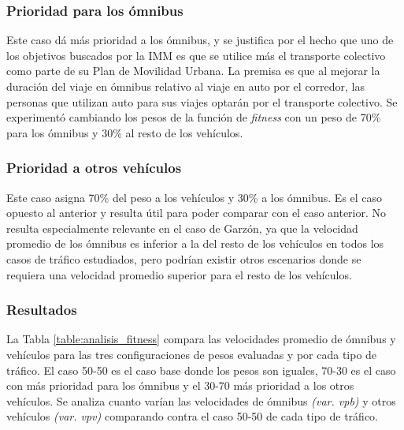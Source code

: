 \subsubsection{Prioridad para los ómnibus}
Este caso dá más prioridad a los ómnibus, y se justifica por el hecho que uno de los objetivos buscados por la IMM es que se utilice más el transporte colectivo como parte de su Plan de Movilidad Urbana. La premisa es que al mejorar la duración del viaje en ómnibus relativo al viaje en auto por el corredor, las personas que utilizan auto para sus viajes optarán por el transporte colectivo. Se experimentó cambiando los pesos de la función de \emph{fitness} con un peso de 70\% para los ómnibus y 30\% al resto de los vehículos.


\subsubsection{Prioridad a otros vehículos}

Este caso asigna 70\% del peso a los vehículos y 30\% a los ómnibus. Es el caso opuesto al anterior y resulta útil para poder comparar con el caso anterior. No resulta especialmente relevante en el caso de Garzón, ya que la velocidad promedio de los ómnibus es inferior a la del resto de los  vehículos en todos los casos de tráfico estudiados, pero podrían existir otros escenarios donde se requiera una velocidad promedio superior para el resto de los vehículos.

\subsubsection{Resultados}

La Tabla \ref{table:analisis_fitness} compara las velocidades promedio de ómnibus y vehículos para las tres configuraciones de pesos evaluadas y por cada tipo de tráfico.  El caso 50-50 es el caso base donde los pesos son iguales, 70-30 es el caso con más prioridad para los ómnibus y el 30-70 más prioridad a los otros vehículos. Se analiza cuanto varían las velocidades de ómnibus \emph{(var. vpb)} y otros vehículos \emph{(var. vpv)} comparando contra el caso 50-50 de cada tipo de tráfico.


